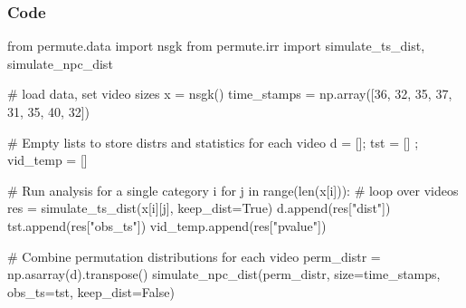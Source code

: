 \documentclass{beamer}
\begin{document}



\begin{frame}[fragile]
\frametitle{Code}
\begin{python}
from permute.data import nsgk
from permute.irr import simulate_ts_dist, simulate_npc_dist

# load data, set video sizes
x = nsgk()
time_stamps = np.array([36, 32, 35, 37, 31, 35, 40, 32])

# Empty lists to store distrs and statistics for each video
d = []; tst = [] ; vid_temp = []

# Run analysis for a single category i
for j in range(len(x[i])):  # loop over videos
        res = simulate_ts_dist(x[i][j], keep_dist=True)
        d.append(res["dist"])
        tst.append(res["obs_ts"])
        vid_temp.append(res["pvalue"])

# Combine permutation distributions for each video
perm_distr = np.asarray(d).transpose()
simulate_npc_dist(perm_distr, size=time_stamps,
                      obs_ts=tst, keep_dist=False)
\end{python}

\end{frame}
\end{document}
